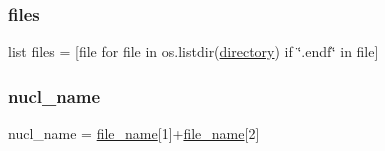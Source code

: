 \subsubsection{\texorpdfstring{files}{files}}
{\footnotesize\ttfamily list files = \mbox{[}file for file in os.\+listdir(\mbox{\hyperlink{namespaceread__fy_ae33b16d23d970509cd2b5f2c059d087f}{directory}}) if \char`\"{}.endf\char`\"{} in file\mbox{]}}

\mbox{\label{namespaceread__fy_a0918c6a9e9f8b48812e163a27a50fe26}} 
\subsubsection{\texorpdfstring{nucl\+\_\+name}{nucl\_name}}
{\footnotesize\ttfamily nucl\+\_\+name = \mbox{\hyperlink{namespaceread__fy_a58ed1f4fc05e40edea694d9f889da543}{file\+\_\+name}}\mbox{[}1\mbox{]}+\mbox{\hyperlink{namespaceread__fy_a58ed1f4fc05e40edea694d9f889da543}{file\+\_\+name}}\mbox{[}2\mbox{]}}

